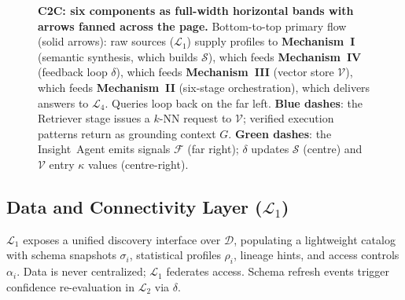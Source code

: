 \documentclass[11pt,a4paper]{article}
\begin{document}
\begin{figure}[htbp]
{%
}%
\caption{\textbf{C2C: six components as full-width horizontal bands with arrows
  fanned across the page.}  Bottom-to-top primary flow (solid arrows): raw sources
  ($\mathcal{L}_1$) supply profiles to \textbf{Mechanism~I} (semantic synthesis,
  which builds $\mathcal{S}$), which feeds \textbf{Mechanism~IV} (feedback loop
  $\delta$), which feeds \textbf{Mechanism~III} (vector store $\mathcal{V}$),
  which feeds \textbf{Mechanism~II} (six-stage orchestration), which delivers
  answers to $\mathcal{L}_4$.  Queries loop back on the far left.
  \textcolor{archblue!65!black}{\textbf{Blue dashes}}: the Retriever stage issues
  a $k$-NN request to $\mathcal{V}$; verified execution patterns return as grounding
  context $G$.
  \textcolor{archgreen!65!black}{\textbf{Green dashes}}: the Insight~Agent emits
  signals $\mathcal{F}$ (far right); $\delta$ updates $\mathcal{S}$ (centre) and
  $\mathcal{V}$ entry $\kappa$ values (centre-right).}
\label{fig:arch}
\end{figure}

\subsection{Data and Connectivity Layer ($\mathcal{L}_1$)}

$\mathcal{L}_1$ exposes a unified discovery interface over $\mathcal{D}$,
populating a lightweight catalog with schema snapshots $\sigma_i$, statistical
profiles $\rho_i$, lineage hints, and access controls $\alpha_i$.  Data is never
centralized; $\mathcal{L}_1$ federates access.  Schema refresh events trigger
confidence re-evaluation in $\mathcal{L}_2$ via $\delta$.
\end{document}

